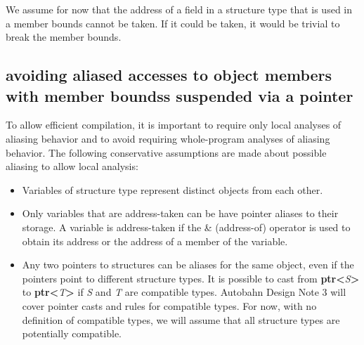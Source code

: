 \documentclass[]{article}
\begin{document}
We assume for now that the address of a field in a structure type that
is used in a member bounds cannot be taken. If it could be taken, it
would be trivial to break the member bounds.

\subsection{\texorpdfstring{\protect\hypertarget{ux5fRef419201770}{}{\protect\hypertarget{ux5fRef420578671}{}{\protect\hypertarget{ux5fToc420589208}{}{\protect\hypertarget{ux5fToc422906999}{}{\protect\hypertarget{ux5fToc424307728}{}{\protect\hypertarget{ux5fToc426641105}{}{\protect\hypertarget{ux5fToc435434987}{}{\protect\hypertarget{ux5fToc437460820}{}{\protect\hypertarget{ux5fToc440445501}{}{\protect\hypertarget{ux5fToc440449283}{}{\protect\hypertarget{ux5fToc440551933}{}{}}}}}}}}}}}avoiding
aliased accesses to object members with member boundss suspended via a
pointer}{avoiding aliased accesses to object members with member boundss suspended via a pointer}}\label{avoiding-aliased-accesses-to-object-members-with-member-boundss-suspended-via-a-pointer}

To allow efficient compilation, it is important to require only local
analyses of aliasing behavior and to avoid requiring whole-program
analyses of aliasing behavior. The following conservative assumptions
are made about possible aliasing to allow local analysis:

\begin{itemize}
\item
  Variables of structure type represent distinct objects from each
  other.
\item
  Only variables that are address-taken can be have pointer aliases to
  their storage. A variable is address-taken if the \& (address-of)
  operator is used to obtain its address or the address of a member of
  the variable.
\item
  Any two pointers to structures can be aliases for the same object,
  even if the pointers point to different structure types. It is
  possible to cast from
  \textbf{ptr\textless{}}\emph{S}\textbf{\textgreater{}} to
  \textbf{ptr\textless{}}\emph{T}\textbf{\textgreater{}} if \emph{S} and
  \emph{T} are compatible types. Autobahn Design Note 3 will cover
  pointer casts and rules for compatible types. For now, with no
  definition of compatible types, we will assume that all structure
  types are potentially compatible.
\end{itemize}
\end{document}

